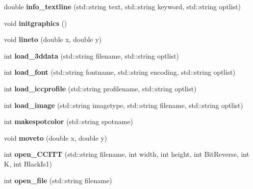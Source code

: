 \begin{DoxyCompactItemize}
\item 
\hypertarget{classPDFlib_a5ae97dc66793508bab806074eb3aaf8e}{}\label{classPDFlib_a5ae97dc66793508bab806074eb3aaf8e} 
double {\bfseries info\+\_\+textline} (std\+::string text, std\+::string keyword, std\+::string optlist)
\item 
\hypertarget{classPDFlib_abafce63a807f731025f6425f1cbf0702}{}\label{classPDFlib_abafce63a807f731025f6425f1cbf0702} 
void {\bfseries initgraphics} ()
\item 
\hypertarget{classPDFlib_a2b424210d5622820e27cf6f089003b06}{}\label{classPDFlib_a2b424210d5622820e27cf6f089003b06} 
void {\bfseries lineto} (double x, double y)
\item 
\hypertarget{classPDFlib_aea233d27c34fa1e9d60e9bc27278e27c}{}\label{classPDFlib_aea233d27c34fa1e9d60e9bc27278e27c} 
int {\bfseries load\+\_\+3ddata} (std\+::string filename, std\+::string optlist)
\item 
\hypertarget{classPDFlib_a7a3fb08e85e9adbe33b834c82d9a7546}{}\label{classPDFlib_a7a3fb08e85e9adbe33b834c82d9a7546} 
int {\bfseries load\+\_\+font} (std\+::string fontname, std\+::string encoding, std\+::string optlist)
\item 
\hypertarget{classPDFlib_a0e9a54de242086ebd19748c3ecf3a47d}{}\label{classPDFlib_a0e9a54de242086ebd19748c3ecf3a47d} 
int {\bfseries load\+\_\+iccprofile} (std\+::string profilename, std\+::string optlist)
\item 
\hypertarget{classPDFlib_a6d69dea52622a7af8d6231e1ada76139}{}\label{classPDFlib_a6d69dea52622a7af8d6231e1ada76139} 
int {\bfseries load\+\_\+image} (std\+::string imagetype, std\+::string filename, std\+::string optlist)
\item 
\hypertarget{classPDFlib_ad593e18f817501af814242eebe39902b}{}\label{classPDFlib_ad593e18f817501af814242eebe39902b} 
int {\bfseries makespotcolor} (std\+::string spotname)
\item 
\hypertarget{classPDFlib_a4b04a1be188fcb180132f2aa4f0a357c}{}\label{classPDFlib_a4b04a1be188fcb180132f2aa4f0a357c} 
void {\bfseries moveto} (double x, double y)
\item 
\hypertarget{classPDFlib_ad680c8f235044b05c2299f35facbe1a4}{}\label{classPDFlib_ad680c8f235044b05c2299f35facbe1a4} 
int {\bfseries open\+\_\+\+C\+C\+I\+TT} (std\+::string filename, int width, int height, int Bit\+Reverse, int K, int Black\+Is1)
\item 
\hypertarget{classPDFlib_ad3b48373b17c17a9e8b491ef1da40bdf}{}\label{classPDFlib_ad3b48373b17c17a9e8b491ef1da40bdf} 
int {\bfseries open\+\_\+file} (std\+::string filename)

\end{DoxyCompactItemize}
